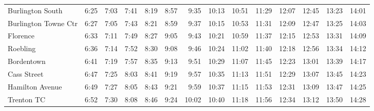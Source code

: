 \begin{center}
\begin{tabular}{@{}lrrrrrrrrrrrrr@{}}
Burlington South & 6:25 & 7:03 & 7:41 & 8:19 & 8:57 & 9:35 & 10:13 & 10:51 & 11:29 & 12:07 & 12:45 & 13:23 & 14:01 \\
Burlington Towne Ctr & 6:27 & 7:05 & 7:43 & 8:21 & 8:59 & 9:37 & 10:15 & 10:53 & 11:31 & 12:09 & 12:47 & 13:25 & 14:03 \\
Florence & 6:33 & 7:11 & 7:49 & 8:27 & 9:05 & 9:43 & 10:21 & 10:59 & 11:37 & 12:15 & 12:53 & 13:31 & 14:09 \\
Roebling & 6:36 & 7:14 & 7:52 & 8:30 & 9:08 & 9:46 & 10:24 & 11:02 & 11:40 & 12:18 & 12:56 & 13:34 & 14:12 \\
Bordentown & 6:41 & 7:19 & 7:57 & 8:35 & 9:13 & 9:51 & 10:29 & 11:07 & 11:45 & 12:23 & 13:01 & 13:39 & 14:17 \\
Cass Street & 6:47 & 7:25 & 8:03 & 8:41 & 9:19 & 9:57 & 10:35 & 11:13 & 11:51 & 12:29 & 13:07 & 13:45 & 14:23 \\
Hamilton Avenue & 6:49 & 7:27 & 8:05 & 8:43 & 9:21 & 9:59 & 10:37 & 11:15 & 11:53 & 12:31 & 13:09 & 13:47 & 14:25 \\
Trenton TC & 6:52 & 7:30 & 8:08 & 8:46 & 9:24 & 10:02 & 10:40 & 11:18 & 11:56 & 12:34 & 13:12 & 13:50 & 14:28 \\
\bottomrule\end{tabular}\end{center}
